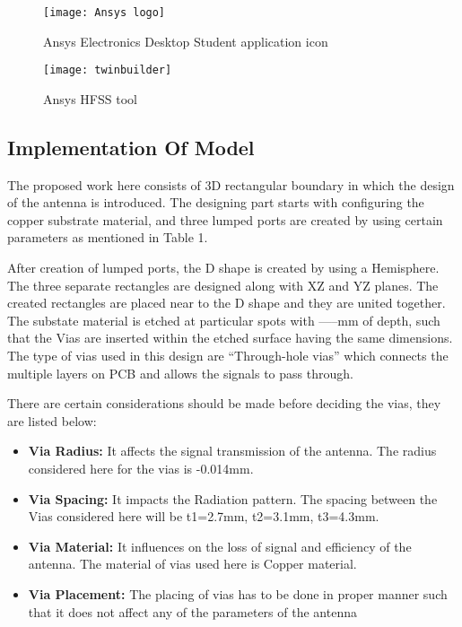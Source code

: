 \documentclass[12pt]{article}
\begin{document}
\begin{center}
\begin{figure}[H]
    \centering
    \texttt{[image: Ansys logo]}
    \caption{Ansys Electronics Desktop Student application icon}
    \label{fig:Ansys logo}
\end{figure}
\end{center}

\begin{center}
\begin{figure}[H]
    \centering
    \texttt{[image: twinbuilder]}
    \caption{Ansys HFSS tool}
    \label{fig:twinbuilder}
\end{figure}
\end{center}

\subsection{Implementation Of Model}
\par The proposed work here consists of 3D rectangular boundary in which the design of the antenna is introduced.
The designing part starts with configuring the copper substrate material, and three lumped ports are created by using certain parameters as mentioned in Table 1. \\


\par  After creation of lumped ports, the D shape is created by using a Hemisphere. The three separate rectangles are designed along with XZ and YZ planes. The created rectangles are placed near to the D shape and they are united together. The substate material is etched at particular spots with -----mm of depth, such that the Vias are inserted within the etched surface having the same dimensions. The type of vias used in this design are “Through-hole vias” which connects the multiple layers on PCB and allows the signals to pass through. \\

\par There are certain considerations should be made before deciding the vias, they are listed below:

\begin{itemize}
    \item \textbf{Via Radius:} It affects the signal transmission of the antenna. The radius considered here for the vias is -0.014mm.
    \item \textbf{Via Spacing:} It impacts the Radiation pattern. The spacing between the Vias considered here will be t1=2.7mm, t2=3.1mm, t3=4.3mm.
    \item \textbf{Via Material:} It influences on the loss of signal and efficiency of the antenna. The material of vias used here is Copper material.
    \item \textbf{Via Placement:} The placing of vias has to be done in proper manner such that it does not affect any of the parameters of the antenna
\end{itemize}
\end{document}

